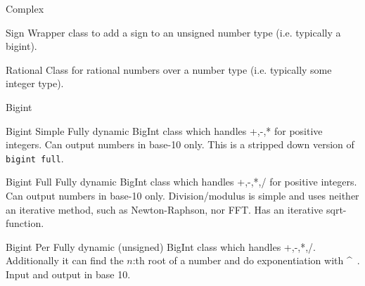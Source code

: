 
\begin{algorithm}{Complex}
\end{algorithm}

\begin{algorithm}{Sign}
\desc
Wrapper class to add a sign to an unsigned number type (i.e. typically a bigint).
\end{algorithm}

\begin{algorithm}{Rational}
Class for rational numbers over a number type (i.e. typically some integer type).
\end{algorithm}

\begin{algorithm}{Bigint}
\end{algorithm}

\begin{algorithm}{Bigint Simple}
\desc
Fully dynamic BigInt class which handles +,-,* for
positive integers. Can output numbers in base-10 only. This is a stripped
down version of {\tt bigint full}.
\end{algorithm}

\begin{algorithm}{Bigint Full}
\desc
Fully dynamic BigInt class which handles +,-,*,/ for
positive integers. Can output numbers in base-10 only. Division/modulus is
simple and uses neither an iterative method, such as Newton-Raphson,
nor FFT. Has an iterative sqrt-function.
\end{algorithm}

\begin{algorithm}{Bigint Per}
\desc
Fully dynamic (unsigned) BigInt class which handles
+,-,*,/. Additionally it can find the $n$:th root of a number and do
exponentiation with \^~. Input and output in base 10.
\end{algorithm}
